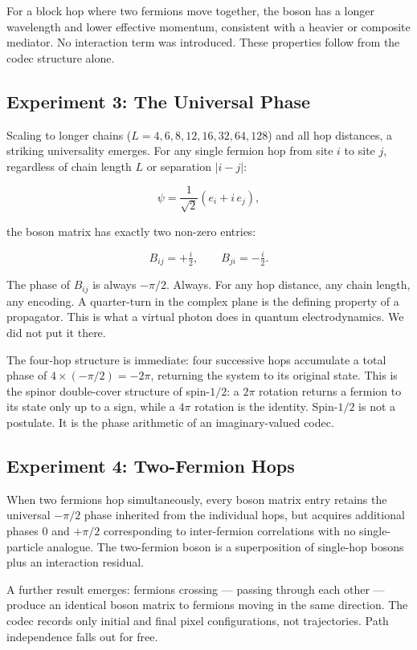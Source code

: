 For a block hop where two fermions move together, the boson has a longer
wavelength and lower effective momentum, consistent with a heavier or
composite mediator. No interaction term was introduced. These properties
follow from the codec structure alone.

\subsection{Experiment 3: The Universal Phase}

Scaling to longer chains ($L = 4, 6, 8, 12, 16, 32, 64, 128$) and all
hop distances, a striking universality emerges. For any single fermion
hop from site $i$ to site $j$, regardless of chain length $L$ or
separation $|i-j|$:

\[
\psi = \frac{1}{\sqrt{2}}(e_i + i\,e_j),
\]

the boson matrix has exactly two non-zero entries:

\[
B_{ij} = +\tfrac{i}{2}, \qquad B_{ji} = -\tfrac{i}{2}.
\]

The phase of $B_{ij}$ is always $-\pi/2$. Always. For any hop distance,
any chain length, any encoding. A quarter-turn in the complex plane is
the defining property of a propagator. This is what a virtual photon
does in quantum electrodynamics. We did not put it there.

The four-hop structure is immediate: four successive hops accumulate a
total phase of $4 \times (-\pi/2) = -2\pi$, returning the system to its
original state. This is the spinor double-cover structure of spin-$1/2$:
a $2\pi$ rotation returns a fermion to its state only up to a sign,
while a $4\pi$ rotation is the identity. Spin-$1/2$ is not a postulate.
It is the phase arithmetic of an imaginary-valued codec.

\subsection{Experiment 4: Two-Fermion Hops}

When two fermions hop simultaneously, every boson matrix entry retains
the universal $-\pi/2$ phase inherited from the individual hops, but
acquires additional phases $0$ and $+\pi/2$ corresponding to
inter-fermion correlations with no single-particle analogue. The
two-fermion boson is a superposition of single-hop bosons plus an
interaction residual.

A further result emerges: fermions crossing --- passing through each
other --- produce an identical boson matrix to fermions moving in the
same direction. The codec records only initial and final pixel
configurations, not trajectories. Path independence falls out for free.

